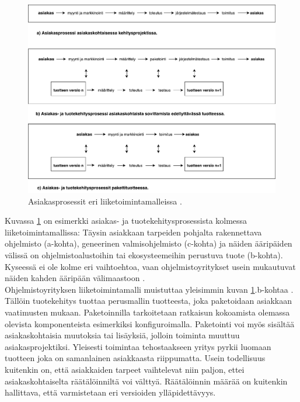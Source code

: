 \documentclass[finnish,12pt,a4paper,pdftex]{article}
\begin{document}
\begin{figure}[!h]
    \centering
    \includegraphics[scale=0.45]{asiakasprosessi.pdf}
    \caption{Asiakasprosessit eri liiketoimintamalleissa \citep{ohjelmistotuotanto}.}
    \label{fig:asiakasprosessi}
\end{figure}

Kuvassa \ref{fig:asiakasprosessi} on esimerkki asiakas- ja tuotekehitysprosessista kolmessa liiketoimintamallissa: Täysin asiakkaan tarpeiden pohjalta rakennettava ohjelmisto (a-kohta), geneerinen valmisohjelmisto (c-kohta) ja näiden ääripäiden välissä on ohjelmistoalustoihin tai ekosysteemeihin perustuva tuote (b-kohta). Kyseessä ei ole kolme eri vaihtoehtoa, vaan ohjelmistoyritykset usein mukautuvat näiden kahden ääripään välimaastoon \citep{okaytannot}.\\

Ohjelmistoyrityksen liiketoimintamalli muistuttaa yleisimmin kuvan \ref{fig:asiakasprosessi}.b-kohtaa \citep{ohjelmistotuotanto}. Tällöin tuotekehitys tuottaa perusmallin tuotteesta, joka paketoidaan asiakkaan vaatimusten mukaan. Paketoinnilla tarkoitetaan ratkaisun kokoamista olemassa olevista komponenteista esimerkiksi konfiguroimalla. Paketointi voi myös sisältää asiakaskohtaisia muutoksia tai lisäyksiä, jolloin toiminta muuttuu asiakasprojektiksi. Yleisesti toimintaa tehostaakseen yritys pyrkii luomaan tuotteen joka on samanlainen asiakkaasta riippumatta. Usein todellisuus kuitenkin on, että asiakkaiden tarpeet vaihtelevat niin paljon, ettei asiakaskohtaiselta räätälöinniltä voi välttyä. Räätälöinnin määrää on kuitenkin hallittava, että varmistetaan eri versioiden ylläpidettävyys. \citep{okaytannot}\\
\end{document}
